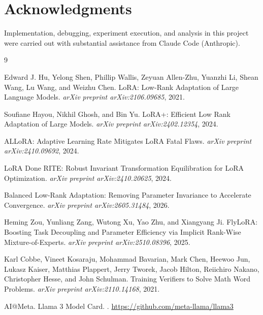 \documentclass[11pt]{article}
\begin{document}
\section*{Acknowledgments}
Implementation, debugging, experiment execution, and analysis in this
project were carried out with substantial assistance from Claude Code
(Anthropic).


\begin{thebibliography}{9}

Edward J. Hu, Yelong Shen, Phillip Wallis, Zeyuan Allen-Zhu, Yuanzhi Li,
Shean Wang, Lu Wang, and Weizhu Chen.
\newblock LoRA: Low-Rank Adaptation of Large Language Models.
\newblock \emph{arXiv preprint arXiv:2106.09685}, 2021.

Soufiane Hayou, Nikhil Ghosh, and Bin Yu.
\newblock LoRA+: Efficient Low Rank Adaptation of Large Models.
\newblock \emph{arXiv preprint arXiv:2402.12354}, 2024.

ALLoRA: Adaptive Learning Rate Mitigates LoRA Fatal Flaws.
\newblock \emph{arXiv preprint arXiv:2410.09692}, 2024.

LoRA Done RITE: Robust Invariant Transformation Equilibration for LoRA
Optimization.
\newblock \emph{arXiv preprint arXiv:2410.20625}, 2024.

Balanced Low-Rank Adaptation: Removing Parameter Invariance to Accelerate
Convergence.
\newblock \emph{arXiv preprint arXiv:2605.31484}, 2026.

Heming Zou, Yunliang Zang, Wutong Xu, Yao Zhu, and Xiangyang Ji.
\newblock FlyLoRA: Boosting Task Decoupling and Parameter Efficiency via
Implicit Rank-Wise Mixture-of-Experts.
\newblock \emph{arXiv preprint arXiv:2510.08396}, 2025.

Karl Cobbe, Vineet Kosaraju, Mohammad Bavarian, Mark Chen, Heewoo Jun,
Lukasz Kaiser, Matthias Plappert, Jerry Tworek, Jacob Hilton, Reiichiro
Nakano, Christopher Hesse, and John Schulman.
\newblock Training Verifiers to Solve Math Word Problems.
\newblock \emph{arXiv preprint arXiv:2110.14168}, 2021.

AI@Meta.
\newblock Llama 3 Model Card.
.
\newblock \url{https://github.com/meta-llama/llama3}

\end{thebibliography}
\end{document}
